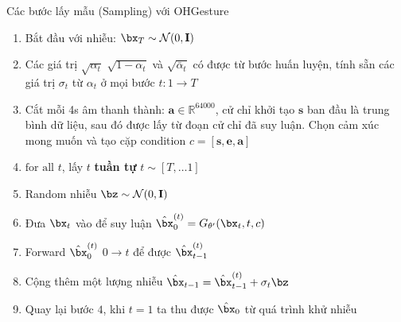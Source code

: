 %	
%	
%	
%
%	



\begin{frame}{Các bước lấy mẫu (Sampling) với OHGesture}
	
	\begin{enumerate}
		\item Bắt đầu với nhiễu: $\bx_T \sim \mathcal{N}(0, \mathbf{I})$
		\item Các giá trị $\sqrt{\alpha_t}$ $\sqrt{1 - \alpha_t}$ và $\sqrt{\bar{\alpha}_t}$ có được từ bước huấn luyện, tính sẵn các giá trị  $\sigma_t$ từ $\alpha_t$ ở mọi bước $t: 1 \rightarrow T$
		\item Cắt mỗi 4s âm thanh thành: $\mathbf{a} \in \mathbb{R}^{64000}$, cử chỉ khởi tạo $\mathbf{s}$ ban đầu là trung bình dữ liệu, sau đó được lấy từ đoạn cử chỉ đã suy luận. Chọn cảm xúc mong muốn  và tạo cặp condition $c = [\mathbf{s}, \mathbf{e}, \mathbf{a}]$
		\item $\text{for all}$ $t$, lấy $t$ \textbf{tuần tự} $t \sim [T, \dots 1]$
		\item Random nhiễu $\bz \sim \mathcal{N}(0, \mathbf{I})$
		\item Đưa $\bx_t$ vào để suy luận $\hat{\bx}_0^{(t)} = G_{\theta'}(\bx_t, t, c)$
		\item Forward $\hat{\bx}_0^{(t)}$ $0 \rightarrow t$ để được $\hat{\bx}_{t-1}^{(t)}$
		\item Cộng thêm một lượng nhiễu $\hat{\bx}_{t-1} = \hat{\bx}_{t-1}^{(t)} + \sigma_t \bz$
		\item Quay lại bước $4$, khi $t=1$ ta thu được $\hat{\bx}_0$ từ quá trình khử nhiễu
	\end{enumerate}
\end{frame}

